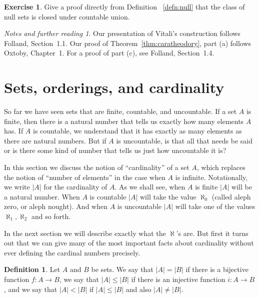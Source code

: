 \documentclass[11pt,oneside]{amsbook}
\theoremstyle{definition}
\newtheorem{exerc}{Exercise}[section]
\theoremstyle{plain}
\theoremstyle{definition}
\newtheorem{defn}[thm]{Definition}
\theoremstyle{remark}
\newtheorem*{notes}{Notes and further reading}
\numberwithin{equation}{section}
\numberwithin{figure}{section}
\begin{document}
\begin{exerc}
  Give a proof directly from Definition ~\ref{defn:null} that the class of null sets is closed under countable union.
\end{exerc}

\begin{notes}
  Our presentation of Vitali's construction follows Folland, Section~1.1. Our proof of Theorem~\ref{thm:caratheodory}, part (a) follows Oxtoby, Chapter~1. For a proof of part (c), see Folland, Section~1.4. 
\end{notes}


\section{Sets, orderings, and cardinality}

So far we have seen sets that are finite, countable, and uncountable. If a set $A$ is finite, then there is a natural number that tells us exactly how many elements $A$ has. If $A$ is countable, we understand that it has exactly as many elements as there are natural numbers. But if $A$ is uncountable, is that all that needs be said or is there some kind of number that tells us just how uncountable it is?

In this section we discuss the notion of ``cardinality'' of a set $A$, which replaces the notion of ``number of elements'' in the case when $A$ is infinite. Notationally, we write $|A|$ for the cardinality of $A$. As we shall see, when $A$ is finite $|A|$ will be a natural number. When $A$ is countable $|A|$ will take the value $\aleph_0$ (called aleph zero, or aleph nought). And when $A$ is uncountable $|A|$ will take one of the values $\aleph_1,\aleph_2$ and so forth.

In the next section we will describe exactly what the $\aleph$'s are. But first it turns out that we can give many of the most important facts about cardinality without ever defining the cardinal numbers precisely.

\begin{defn}
  \label{defn:cardinal-rel}
  Let $A$ and $B$ be sets. We say that $|A|=|B|$ if there is a bijective function $f\colon A\to B$, we say that $|A|\leq|B|$ if there is an injective function $i\colon A\to B$, and we say that $|A|<|B|$ if $|A|\leq|B|$ and also $|A|\neq|B|$.
\end{defn}
\end{document}
